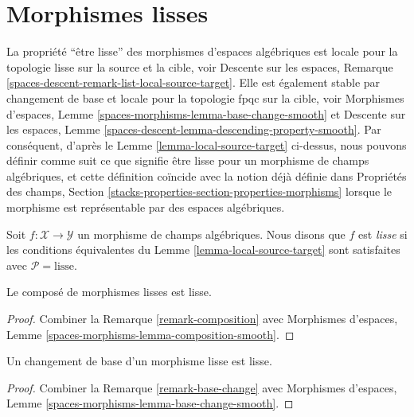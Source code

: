 \section{Morphismes lisses}
\label{section-smooth}

\noindent
La propriété ``être lisse'' des morphismes d'espaces
algébriques est locale pour la topologie lisse sur la source et la cible, voir
Descente sur les espaces, Remarque \ref{spaces-descent-remark-list-local-source-target}.
Elle est également stable par changement de base et locale pour la topologie fpqc sur la cible, voir
Morphismes d'espaces,
Lemme \ref{spaces-morphisms-lemma-base-change-smooth}
et
Descente sur les espaces, Lemme
\ref{spaces-descent-lemma-descending-property-smooth}.
Par conséquent, d'après le
Lemme \ref{lemma-local-source-target}
ci-dessus, nous pouvons définir comme suit ce que signifie être lisse pour un
morphisme de champs algébriques, et cette définition coïncide avec la notion
déjà définie dans
Propriétés des champs,
Section \ref{stacks-properties-section-properties-morphisms}
lorsque le morphisme est représentable par des espaces algébriques.

\begin{definition}
\label{definition-smooth}
Soit $f : \mathcal{X} \to \mathcal{Y}$ un morphisme de champs algébriques.
Nous disons que $f$ est {\it lisse} si les conditions équivalentes du
Lemme \ref{lemma-local-source-target}
sont satisfaites avec $\mathcal{P} = \text{lisse}$.
\end{definition}

\begin{lemma}
\label{lemma-composition-smooth}
Le composé de morphismes lisses est lisse.
\end{lemma}

\begin{proof}
Combiner
la Remarque \ref{remark-composition}
avec
Morphismes d'espaces, Lemme
\ref{spaces-morphisms-lemma-composition-smooth}.
\end{proof}

\begin{lemma}
\label{lemma-base-change-smooth}
Un changement de base d'un morphisme lisse est lisse.
\end{lemma}

\begin{proof}
Combiner
la Remarque \ref{remark-base-change}
avec
Morphismes d'espaces, Lemme
\ref{spaces-morphisms-lemma-base-change-smooth}.
\end{proof}

